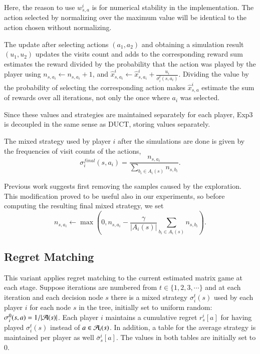 \noindent Here, the reason to use $w^i_{s,a}$ is for numerical stability in the implementation.
The action selected by normalizing over the maximum value will be identical to the action chosen without normalizing.

The update after selecting actions $(a_1,a_2)$ and obtaining a simulation result $(u_1,u_2)$ updates the visits count
and adds to the corresponding reward sum estimates the reward divided by the probability that the action was played by the player using
$n_{s,a_i} \leftarrow n_{s,a_i} + 1$, and $\hat{x}^i_{s,a_i} \leftarrow \hat{x}^i_{s,a_i} + \frac{u_i}{\sigma^t_i(s,a_i)}$.
Dividing the value by the probability of selecting the corresponding action makes $\hat{x}^i_{s,a}$ estimate the sum of rewards over all 
iterations, not only the once where     $a_i$ was selected.

Since these values and strategies are maintained separately for each player,
Exp3 is decoupled in the same sense as DUCT, storing values separately. 

The mixed strategy used by player $i$ after the simulations are done is given by the frequencies of visit counts of the actions,
\[\sigma^{final}_i(s,a_i) = \frac{n_{s,a_i}}{\sum_{b_i\in A_i(s)} n_{s,b_i}}.\]

Previous work \cite{Teytaud11Upper} suggests first removing the samples caused by the exploration. 
This modification proved to be useful also in our experiments, so before      computing the resulting final mixed strategy, we set
\begin{equation}
n_{s,a_i} \leftarrow \max\left(0,n_{s,a_i} - \frac{\gamma}{|A_i(s)|}\sum_{b_i\in A_i(s)}n_{s,b_i}\right).
\end{equation}

\subsection{Regret Matching} \label{sec:rm}

This variant applies regret matching \cite{Hart00} to the current estimated matrix game at each stage.
Suppose iterations are numbered from $t \in \{ 1, 2, 3, \cdots \}$ and at each iteration and each decision node $s$
there is a mixed strategy $\sigma_i^t(s)$ used by each player $i$ for each node $s$ in the tree, initially set to
uniform random: $\sigma^0_i(s,a) = 1 / |\mathcal{A}(s)|$.
Each player $i$ maintains a cumulative regret $r^i_s[a]$ for having played $\sigma_i^t(s)$ instead of $a \in \mathcal{A}_i(s)$.
In addition, a table for the average strategy is maintained per player as
well $\bar{\sigma}^i_s[a]$. The values in both tables are initially set to 0.

